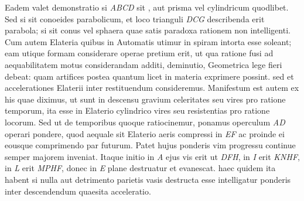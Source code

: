 \footnotesize Eadem valet demonstratio si \textit{ABCD} sit , aut prisma vel cylindricum quodlibet. Sed si sit conoeides parabolicum, et loco trianguli \textit{DCG} describenda erit parabola; si sit conus vel sphaera  quae satis paradoxa  rationem non intelligenti. Cum autem Elateria\protect{} quibus in Automatis\protect{} utimur in spiram\protect{} intorta esse soleant; eam utique formam considerare operae pretium erit, ut  qua ratione fusi ad aequabilitatem motus considerandam additi, deminutio, Geometrica lege fieri debeat: quam artifices postea quantum licet in materia exprimere possint.  sed et accelerationes\protect{} Elaterii\protect{} inter restituendum consideremus. Manifestum est autem ex his quae diximus, ut sunt in descensu gravium celeritates\protect{} seu vires pro ratione temporum, ita esse in Elaterio\protect{} cylindrico vires seu resistentias pro ratione locorum. 
\pend 
\pstart \footnotesize Sed ut de temporibus quoque ratiocinemur, ponamus operculum \textit{AD} operari pondere, quod aequale sit Elaterio aeris\protect{} compressi in \textit{EF} ac proinde ei eousque comprimendo par futurum. Patet hujus ponderis\protect{} vim progressu continue  semper majorem inveniat. Itaque initio in \textit{A} ejus vis erit ut \textit{DFH},  in \textit{I} erit \textit{KNHF}, in \textit{L} erit \textit{MPHF}, donec in \textit{E} plane destruatur et evanescat.  haec quidem ita habent si nulla aut detrimento\protect{} parietis vasis destructa esse intelligatur ponderis\protect{} inter descendendum quaesita acceleratio\protect{}. 

